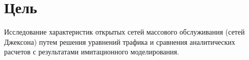 \chapter*{Цель}
\label{ch:intro}

    Исследование характеристик открытых сетей массового обслуживания (сетей Джексона) путем решения уравнений трафика и сравнения аналитических расчетов с результатами имитационного моделирования.

\endinput
